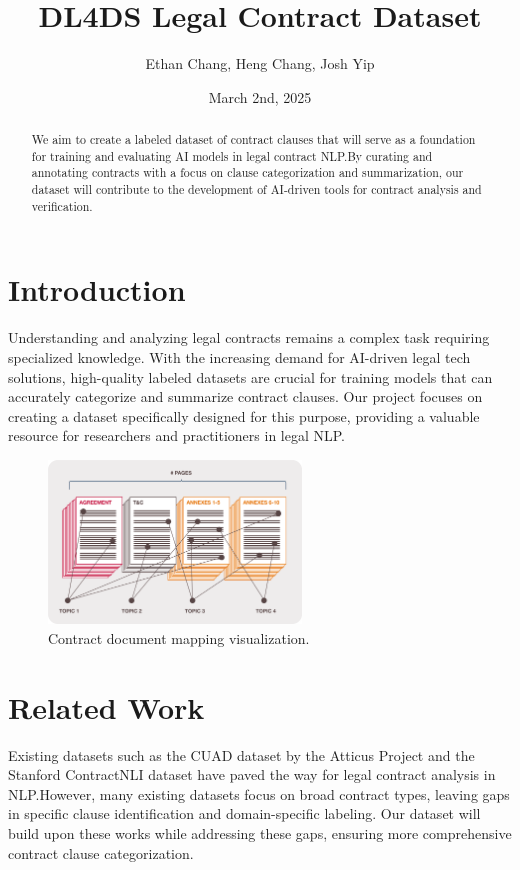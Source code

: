 \documentclass[11pt, oneside]{article}   	%
\title{DL4DS Legal Contract Dataset}
\author{Ethan Chang, Heng Chang, Josh Yip}
\date{March 2nd, 2025}		%
\begin{document}
\maketitle
\begin{abstract}
We aim to create a labeled dataset of contract clauses that will serve as a foundation for 
training and evaluating AI models in legal contract NLP.\@ By curating and annotating contracts with a focus on clause categorization and summarization, our dataset will contribute to the development of AI-driven tools for contract analysis and verification.
\end{abstract}



\section*{Introduction}
Understanding and analyzing legal contracts remains a complex task requiring specialized knowledge. With the increasing demand for AI-driven legal tech solutions, high-quality labeled datasets are crucial for training models that can accurately categorize and summarize contract clauses. Our project focuses on creating a dataset specifically designed for this purpose, providing a valuable resource for researchers and practitioners in legal NLP.\@

\begin{figure}[h]
    \centering
    \includegraphics[width=0.6\textwidth]{image.png}
    \caption{Contract document mapping visualization.}
	\label{fig:contract-doc-map}
\end{figure}


\section*{Related Work}
Existing datasets such as the CUAD dataset by the Atticus Project and the Stanford ContractNLI dataset have paved the way for legal contract analysis in NLP.\@ However, many existing datasets focus on broad contract types, leaving gaps in specific clause identification and domain-specific labeling. Our dataset will build upon these works while addressing these gaps, ensuring more comprehensive contract clause categorization.
\end{document}
